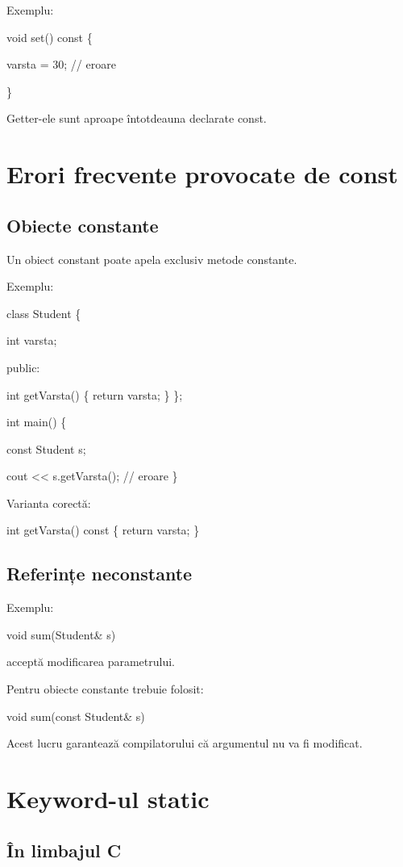 \documentclass[12pt,a4paper]{article}
\begin{document}
Exemplu:

void set() const \{

    varsta = 30; // eroare

\}

Getter-ele sunt aproape întotdeauna declarate const.

\section{Erori frecvente provocate de const}

\subsection{Obiecte constante}

Un obiect constant poate apela exclusiv metode constante.

Exemplu:

class Student \{

    int varsta;

public:

    int getVarsta() \{
        return varsta;
    \}
\};

int main() \{

    const Student s;

    cout << s.getVarsta(); // eroare
\}

Varianta corectă:

int getVarsta() const \{
    return varsta;
\}

\subsection{Referințe neconstante}

Exemplu:

void sum(Student\& s)

acceptă modificarea parametrului.

Pentru obiecte constante trebuie folosit:

void sum(const Student\& s)

Acest lucru garantează compilatorului că argumentul nu va fi modificat.

\section{Keyword-ul static}

\subsection{În limbajul C}
\end{document}
